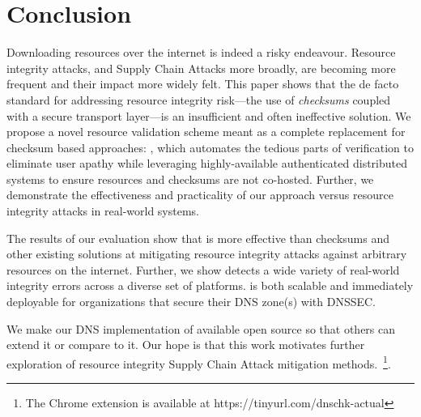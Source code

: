 \section{Conclusion} \label{sec:conclusion}

Downloading resources over the internet is indeed a risky endeavour. Resource
integrity attacks, and Supply Chain Attacks more broadly, are becoming more
frequent and their impact more widely felt. This paper shows that the de facto
standard for addressing resource integrity risk---the use of \emph{checksums}
coupled with a secure transport layer---is an insufficient and often ineffective
solution. We propose a novel resource validation scheme meant as a complete
replacement for checksum based approaches: \SYSTEM{}, which automates the
tedious parts of verification to eliminate user apathy while leveraging
highly-available authenticated distributed systems to ensure resources and
checksums are not co-hosted. Further, we demonstrate the effectiveness and
practicality of our approach versus resource integrity attacks in real-world
systems.

The results of our evaluation show that \SYSTEM{} is more effective than
checksums and other existing solutions at mitigating resource integrity attacks
against arbitrary resources on the internet. Further, we show \SYSTEM{} detects
a wide variety of real-world integrity errors across a diverse set of platforms.
\SYSTEM{} is both scalable and immediately deployable for organizations that
secure their DNS zone(s) with DNSSEC.

We make our DNS implementation of \SYSTEM{} available open source so that others
can extend it or compare to it. Our hope is that this work motivates further
exploration of resource integrity Supply Chain Attack mitigation
methods.~\footnote{The \SYSTEM{} Chrome extension is available at
https://tinyurl.com/dnschk-actual}.
